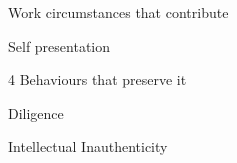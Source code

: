 \documentclass[aspectratio=169]{beamer}
\begin{document}
\begin{frame}
  \begin{center}
    \Huge Work circumstances that contribute
    \\ \small \cite{hh15}
  \end{center}
\end{frame}

\begin{frame}
  \begin{center}
    \Huge Self presentation
    \\ \small \cite{sakulku11}
  \end{center}
\end{frame}

\begin{frame}
  \begin{center}
    \Huge 4 Behaviours that preserve it
  \end{center}
\end{frame}

\begin{frame}
  \begin{center}
    \Huge Diligence
    \\ \small \cite{clanceimes78}

  \end{center}
\end{frame}

\begin{frame}
  \begin{center}
    \Huge Intellectual Inauthenticity
    \\ \small \cite{clanceimes78}
  \end{center}
\end{frame}
\end{document}
